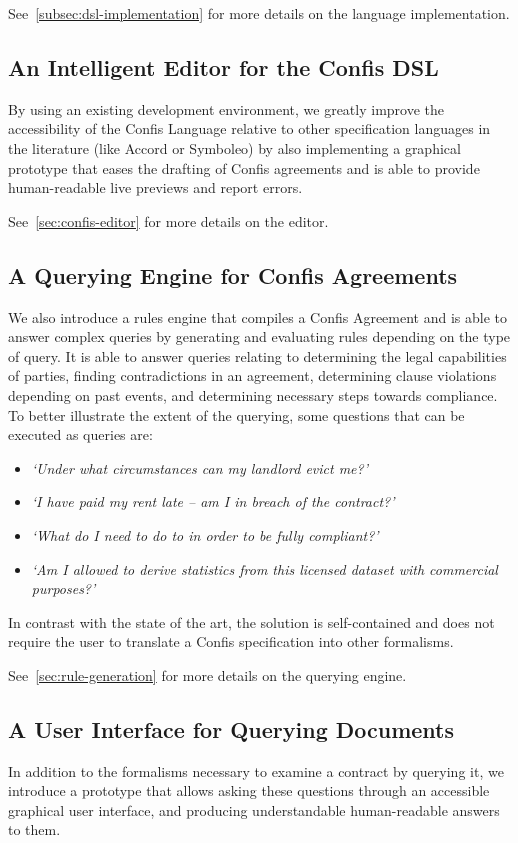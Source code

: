 See~\autoref{subsec:dsl-implementation} for more details on the language implementation.

\subsection{An Intelligent Editor for the Confis DSL}
By using an existing development environment, we greatly improve the accessibility of the Confis Language relative to other specification languages in the literature (like Accord or Symboleo) by also implementing a graphical prototype that eases the drafting of Confis agreements and is able to provide human-readable live previews and report errors.

See~\autoref{sec:confis-editor} for more details on the editor.

\subsection{A Querying Engine for Confis Agreements}
We also introduce a rules engine that compiles a Confis Agreement and is able to answer complex queries by generating and evaluating rules depending on the type of query.
It is able to answer queries relating to determining the legal capabilities of parties, finding contradictions in an agreement, determining clause violations depending on past events, and determining necessary steps towards compliance.
To better illustrate the extent of the querying, some questions that can be executed as queries are:
\begin{itemize}
    \item \emph{`Under what circumstances can my landlord evict me?'}
    \item \emph{`I have paid my rent late -- am I in breach of the contract?'}
    \item \emph{`What do I need to do to in order to be fully compliant?'}
    \item \emph{`Am I allowed to derive statistics from this licensed dataset with commercial purposes?'}
\end{itemize}
In contrast with the state of the art, the solution is self-contained and does not require the user to translate a Confis specification into other formalisms.

See~\autoref{sec:rule-generation} for more details on the querying engine.


\subsection{A User Interface for Querying Documents}
In addition to the formalisms necessary to examine a contract by querying it, we introduce a prototype that allows asking these questions through an accessible graphical user interface, and producing understandable human-readable answers to them.

